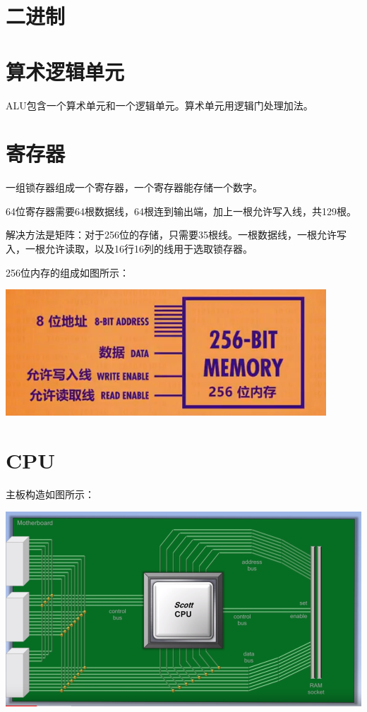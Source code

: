\documentclass{ctexart}
\begin{document}
	\section{二进制}
	\section{算术逻辑单元}
	ALU包含一个算术单元和一个逻辑单元。算术单元用逻辑门处理加法。
	\section{寄存器}
	一组锁存器组成一个寄存器，一个寄存器能存储一个数字。
	
	64位寄存器需要64根数据线，64根连到输出端，加上一根允许写入线，共129根。
	
	解决方法是矩阵：对于256位的存储，只需要35根线。一根数据线，一根允许写入，一根允许读取，以及16行16列的线用于选取锁存器。
	
	256位内存的组成如图所示：
	
	\includegraphics[scale=1]{Memory}
	
	\section{CPU}
	主板构造如图所示：
	
	\includegraphics[scale=0.5]{CPU}
	
\end{document}
